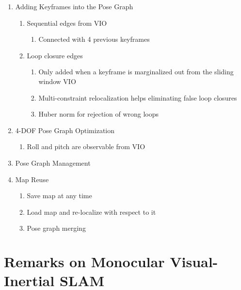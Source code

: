 \documentclass[12pt,a4paper]{article}
\begin{document}
\begin{enumerate}
\item Adding Keyframes into the Pose Graph

\begin{enumerate}
\item Sequential edges from VIO
  \begin{enumerate}
  \item Connected with 4 previous keyframes
  \end{enumerate}
\item Loop closure edges
  \begin{enumerate}
  \item Only added when a keyframe is marginalized out from the sliding window VIO
  \item Multi-constraint relocalization helps eliminating false loop closures
  \item Huber norm for rejection of wrong loops
  \end{enumerate}
\end{enumerate}

\item 4-DOF Pose Graph Optimization

\begin{enumerate}
\item Roll and pitch are observable from VIO
\end{enumerate}

\item Pose Graph Management

\item Map Reuse

\begin{enumerate}
\item Save map at any time
\item Load map and re-localize with respect to it
\item Pose graph merging
\end{enumerate}

\end{enumerate}

\section{Remarks on Monocular Visual-Inertial SLAM}
\end{document}
